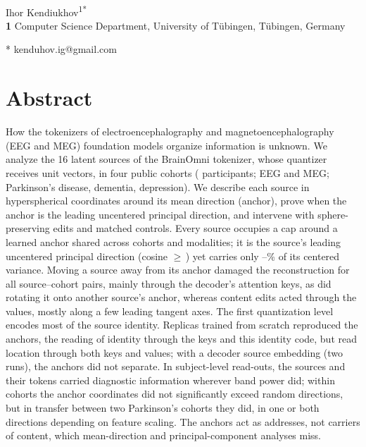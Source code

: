 \documentclass[10pt,letterpaper]{article}
\begin{document}
\vspace*{0.2in}

\begin{flushleft}
{\Large
\textbf{}
}
\newline
\\
Ihor Kendiukhov\textsuperscript{1*}
\\
\bigskip
\textbf{1} Computer Science Department, University of T\"ubingen, T\"ubingen, Germany
\\
\bigskip

* kenduhov.ig@gmail.com

\end{flushleft}

\section*{Abstract}
How the tokenizers of electroencephalography and magnetoencephalography (EEG and MEG) foundation models organize information is unknown. We
analyze the 16 latent sources of the BrainOmni tokenizer, whose quantizer receives unit vectors, in
four public cohorts (\NsubjTotal{} participants; EEG and MEG; Parkinson's disease, dementia,
depression). We describe each source in
hyperspherical coordinates around its mean direction (anchor), prove when the anchor is the leading
uncentered principal direction, and intervene with sphere-preserving edits and matched controls.
Every source occupies a cap around a learned anchor shared across cohorts and modalities; it is the
source's leading uncentered principal direction (cosine $\geq$\,\CosUncMin) yet carries only
\AnchorVarFracMin--\AnchorVarFracMax\% of its centered variance. Moving a source away from its
anchor damaged the reconstruction for all \SourceCohortPairs{} source--cohort pairs, mainly through
the decoder's attention keys, as did rotating it onto another source's anchor, whereas content edits
acted through the values, mostly along a few leading tangent axes. The first quantization
level encodes most of the source identity. Replicas trained from scratch reproduced the anchors,
the reading of identity through the keys and this identity code, but read location through both keys and
values; with a decoder source embedding (two runs),
the anchors did not separate. In subject-level read-outs, the sources and their tokens carried
diagnostic information wherever band power did; within cohorts the anchor coordinates did not
significantly exceed random directions, but in transfer between two Parkinson's cohorts they did, in one
or both directions depending on feature scaling. The anchors act as addresses, not carriers of content,
which mean-direction and principal-component analyses miss.
\end{document}
